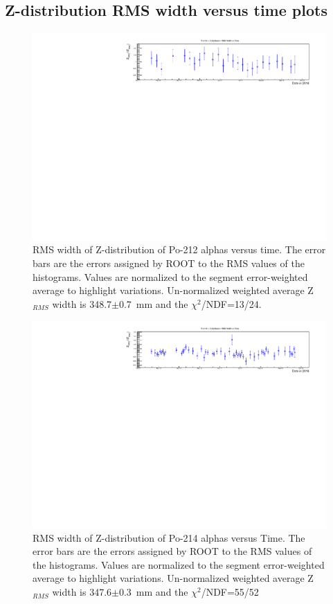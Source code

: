 \subsection{Z-distribution RMS width versus time plots}
\begin{figure}[!h]
\centering
\includegraphics[width=1.05\textwidth]{figures/PubBiPo212ZrmsvsT.pdf}
\caption{\label{fig:ZRMSvsT212}RMS width of Z-distribution of Po-212 alphas versus time. The error bars are the errors assigned by ROOT to the RMS values of the histograms. Values are normalized to the segment error-weighted average to highlight variations. Un-normalized weighted average Z$_{RMS}$ width is 348.7$\pm$0.7~mm and the $\chi^2$/NDF=13/24. }
\end{figure}
\begin{figure}[!h]
\centering
\includegraphics[width=1.05\textwidth]{figures/PubBiPo214ZrmsvsT.pdf}
\caption{\label{fig:ZRMSvsT214}RMS width of Z-distribution of Po-214 alphas versus Time. The error bars are the errors assigned by ROOT to the RMS values of the histograms. Values are normalized to the segment error-weighted average to highlight variations. Un-normalized weighted average Z$_{RMS}$ width is 347.6$\pm$0.3~mm and the $\chi^2$/NDF=55/52}
\end{figure}
\newpage
